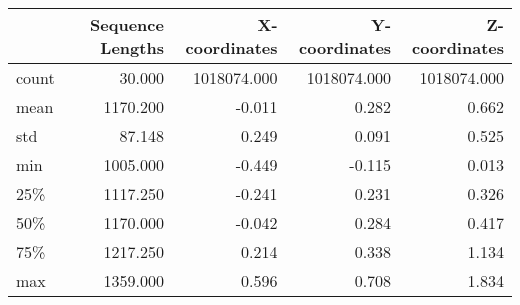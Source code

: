 \begin{tabular}{lrrrr}
\toprule
{} &  Sequence Lengths &  X-coordinates &  Y-coordinates &  Z-coordinates \\
\midrule
count &            30.000 &    1018074.000 &    1018074.000 &    1018074.000 \\
mean  &          1170.200 &         -0.011 &          0.282 &          0.662 \\
std   &            87.148 &          0.249 &          0.091 &          0.525 \\
min   &          1005.000 &         -0.449 &         -0.115 &          0.013 \\
25\%   &          1117.250 &         -0.241 &          0.231 &          0.326 \\
50\%   &          1170.000 &         -0.042 &          0.284 &          0.417 \\
75\%   &          1217.250 &          0.214 &          0.338 &          1.134 \\
max   &          1359.000 &          0.596 &          0.708 &          1.834 \\
\bottomrule
\end{tabular}
